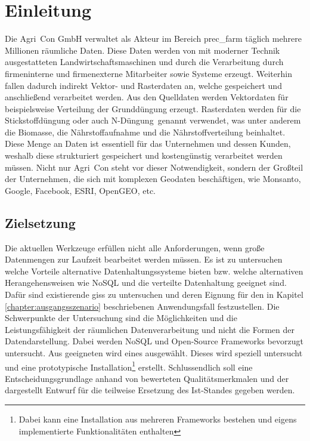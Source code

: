 \chapter{Einleitung}
Die Agri~Con GmbH verwaltet als Akteur im Bereich \Gls{prec_farm} täglich mehrere Millionen räumliche Daten. Diese Daten werden von mit moderner Technik ausgestatteten Landwirtschaftsmaschinen und durch die Verarbeitung durch firmeninterne und firmenexterne Mitarbeiter sowie Systeme erzeugt. Weiterhin fallen dadurch indirekt Vektor- und Rasterdaten an, welche gespeichert und anschließend verarbeitet werden.
Aus den Quelldaten werden Vektordaten für beispielsweise Verteilung der Grunddüngung erzeugt. Rasterdaten werden für die Stickstoffdüngung oder auch \glqq N-Düngung\grqq\ genannt verwendet, was unter anderem die Biomasse, die Nährstoffaufnahme und die Nährstoffverteilung beinhaltet.
Diese Menge an Daten ist essentiell für das Unternehmen und dessen Kunden, weshalb diese strukturiert gespeichert und kostengünstig verarbeitet werden müssen. Nicht nur Agri~Con steht vor dieser Notwendigkeit, sondern der Großteil der Unternehmen, die sich mit komplexen Geodaten beschäftigen, wie Monsanto, Google, Facebook, ESRI, OpenGEO, etc.




\section{Zielsetzung}

Die aktuellen Werkzeuge erfüllen nicht alle Anforderungen, wenn große Datenmengen zur Laufzeit bearbeitet werden müssen. Es ist zu untersuchen welche Vorteile alternative Datenhaltungssysteme bieten bzw. welche alternativen Herangehensweisen wie NoSQL und die verteilte Datenhaltung geeignet sind.
Dafür sind existierende \Glspl{gis} zu untersuchen und deren Eignung für den in Kapitel \ref{chapter:ausgangsszenario} beschriebenen Anwendungsfall festzustellen. Die Schwerpunkte der Untersuchung sind die Möglichkeiten und die Leistungsfähigkeit der räumlichen Datenverarbeitung und nicht die Formen der Datendarstellung.
Dabei werden NoSQL und Open-Source Frameworks bevorzugt untersucht.
Aus geeigneten wird eines ausgewählt. Dieses wird speziell untersucht und eine prototypische Installation\footnote{Dabei kann eine Installation aus mehreren Frameworks bestehen und eigens implementierte Funktionalitäten enthalten} erstellt.
Schlussendlich soll eine Entscheidungsgrundlage anhand von bewerteten Qualitätsmerkmalen und der dargestellt Entwurf für die teilweise Ersetzung des Ist-Standes gegeben werden.


